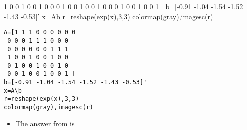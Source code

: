 \begin{example}
{{ 1 0 0 1 0 0 1 0 0 
 0 1 0 0 1 0 0 1 0 
 0 0 1 0 0 1 0 0 1 ]
b=[-0.91 -1.04 -1.54 -1.52 -1.43 -0.53]'
x=A\slosh b
r=reshape(exp(x),3,3)
colormap(gray),imagesc(r)
}}%
\marginpar{\usebox{\ajrqrbox\\[2ex]}}%
\begin{verbatim}
A=[1 1 1 0 0 0 0 0 0 
 0 0 0 1 1 1 0 0 0 
 0 0 0 0 0 0 1 1 1
 1 0 0 1 0 0 1 0 0 
 0 1 0 0 1 0 0 1 0 
 0 0 1 0 0 1 0 0 1 ]
b=[-0.91 -1.04 -1.54 -1.52 -1.43 -0.53]'
x=A\b
r=reshape(exp(x),3,3)
colormap(gray),imagesc(r)
\end{verbatim}
\def\temp#1#2#3#4#5#6#7#8#9{\begin{tikzpicture}
\begin{axis}[tiny,axis equal image,colormap/blackwhite,axis lines=none]
\addplot[patch,patch type=rectangle
,point meta min={0},point meta max={1}
,table/row sep=\\,patch table with point meta={%
8 9 13 12   #1\\
4 5 9 8     #2\\
0 1 5 4     #3\\
9 10 14 13  #4\\
5 6 10 9    #5\\
1 2 6 5     #6\\
10 11 15 14 #7\\
6 7 11 10   #8\\
2 3 7 6     #9\\
}]
table[row sep=\\] {
x y \\
0 0\\%
1 0\\%
2 0\\%
3 0\\%
0 1\\%
1 1\\%
2 1\\%
3 1\\%
0 2\\%
1 2\\%
2 2\\%
3 2\\%
0 3\\%
1 3\\%
2 3\\%
3 3\\%
};
\end{axis}
\end{tikzpicture}}%
\begin{itemize}
\item 
The answer from \script[2] is \twodp

\end{itemize}
\end{example}
